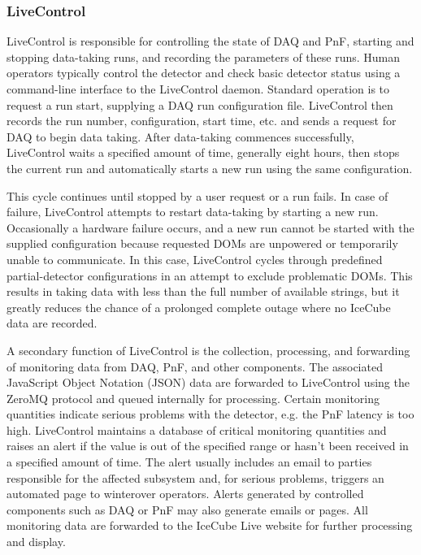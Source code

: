 \subsubsection{LiveControl}

LiveControl is responsible for controlling the state of DAQ and PnF, starting and
stopping data-taking runs, and recording the parameters of these runs.
Human operators typically control the detector and check basic 
detector status using a command-line interface to the LiveControl
daemon. Standard operation is to 
request a run start, supplying a DAQ run configuration 
file.  LiveControl then records the run number, configuration, start time,
etc. and sends a request 
for DAQ to begin data taking.  After data-taking commences successfully,
LiveControl waits a specified amount of time, generally eight hours, then
stops the current run and automatically starts a new run using the same
configuration.

This cycle continues until stopped by a user request or a
run fails.  In case of failure, LiveControl attempts to restart data-taking
by starting a new run.  Occasionally a hardware failure occurs, and a new
run cannot be started with the supplied configuration because requested
DOMs are unpowered or temporarily unable to communicate.  In this case,
LiveControl cycles through predefined partial-detector 
configurations in an attempt to exclude problematic DOMs.  This results in
taking data with less than the full number of available strings, but it
greatly reduces the chance of a prolonged complete outage where no IceCube
data are recorded.

A secondary function of LiveControl is the collection, processing, and
forwarding of monitoring data from DAQ, PnF, and other
components.  The associated JavaScript Object Notation (JSON) data are
forwarded to LiveControl using the ZeroMQ protocol and queued internally 
for processing.  Certain monitoring quantities indicate serious problems with
the detector, e.g. the PnF latency is too high.  LiveControl
maintains a database of critical monitoring quantities and raises an alert
if the value is out of the specified range or 
hasn't been received in a specified amount of time.  The alert usually
includes an email to parties responsible for the affected subsystem and,
for serious problems, triggers an automated page to winterover operators.
Alerts generated by controlled components such as DAQ or PnF may also
generate emails or pages.
All monitoring data are forwarded to the IceCube Live website for further
processing and display.

